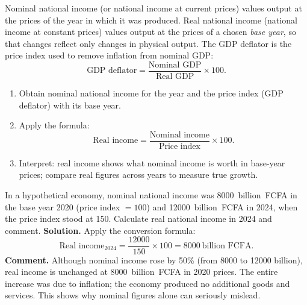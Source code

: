 \documentclass[11pt]{article}
\newcommand{\cle}[1]{{\popxbold\color{popdark}#1}}
\begin{document}
\begin{definition}
\cle{Nominal national income} (or national income at current prices) values output at the prices of the year in which it was produced. \cle{Real national income} (national income at constant prices) values output at the prices of a chosen \emph{base year}, so that changes reflect only changes in physical output. The \cle{GDP deflator} is the price index used to remove inflation from nominal GDP:
\[ \text{GDP deflator} = \frac{\text{Nominal GDP}}{\text{Real GDP}} \times 100. \]
\end{definition}

\begin{methode}
\begin{enumerate}
\item Obtain nominal national income for the year and the price index (GDP deflator) with its base year.
\item Apply the formula:
\[ \text{Real income} = \frac{\text{Nominal income}}{\text{Price index}} \times 100. \]
\item Interpret: real income shows what nominal income is worth in base-year prices; compare real figures across years to measure true growth.
\end{enumerate}
\end{methode}

\begin{exoresolu}
In a hypothetical economy, nominal national income was \SI{8000}{billion FCFA} in the base year 2020 (price index $=100$) and \SI{12000}{billion FCFA} in 2024, when the price index stood at 150. Calculate real national income in 2024 and comment.
\tcblower
\textbf{Solution.} Apply the conversion formula:
\[ \text{Real income}_{2024} = \frac{12000}{150}\times 100 = 8000\ \text{billion FCFA}. \]
\textbf{Comment.} Although nominal income rose by 50\% (from 8000 to 12000 billion), real income is unchanged at \SI{8000}{billion FCFA} in 2020 prices. The entire increase was due to inflation; the economy produced no additional goods and services. This shows why nominal figures alone can seriously mislead.
\end{exoresolu}
\end{document}
